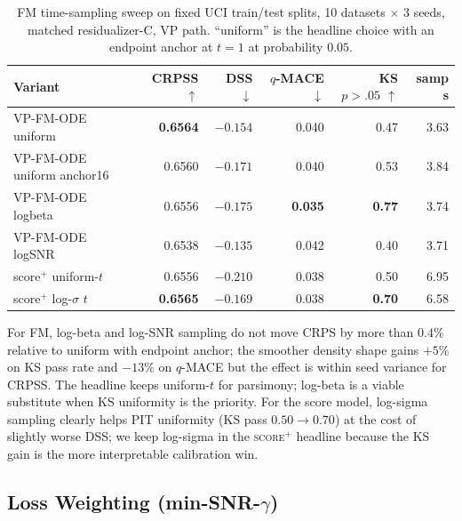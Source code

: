 \documentclass{tpm2026}
\begin{document}
\begin{table}[!h]
  \centering
  \caption{FM time-sampling sweep on fixed UCI train/test splits, 10 datasets $\times$ 3 seeds, matched residualizer-C, VP path. ``uniform'' is the headline choice with an endpoint anchor at $t=1$ at probability $0.05$.}\label{tab:t-sampling}
  \footnotesize
  \begin{tabular}{lrrrrr}
    \toprule
    Variant & CRPSS $\uparrow$ & DSS $\downarrow$ & $q$-MACE $\downarrow$ & KS $p{>}.05$ $\uparrow$ & samp s \\
    \midrule
    VP-FM-ODE uniform           & \textbf{0.6564} & $-0.154$ & 0.040 & 0.47 & 3.63 \\
    VP-FM-ODE uniform anchor16  & 0.6560 & \textbf{$-0.171$} & 0.040 & 0.53 & 3.84 \\
    VP-FM-ODE logbeta           & 0.6556 & $-0.175$ & \textbf{0.035} & \textbf{0.77} & 3.74 \\
    VP-FM-ODE logSNR            & 0.6538 & $-0.135$ & 0.042 & 0.40 & 3.71 \\
    \midrule
    score$^+$ uniform-$t$       & 0.6556 & \textbf{$-0.210$} & 0.038 & 0.50 & 6.95 \\
    score$^+$ log-$\sigma$ $t$  & \textbf{0.6565} & $-0.169$ & 0.038 & \textbf{0.70} & 6.58 \\
    \bottomrule
  \end{tabular}
\end{table}

For FM, log-beta and log-SNR sampling do not move CRPS by more than $0.4\%$ relative to uniform with endpoint anchor; the smoother density shape gains $+5\%$ on KS pass rate and $-13\%$ on $q$-MACE but the effect is within seed variance for CRPSS. The headline keeps uniform-$t$ for parsimony; log-beta is a viable substitute when KS uniformity is the priority. For the score model, log-sigma sampling clearly helps PIT uniformity (KS pass $0.50 \to 0.70$) at the cost of slightly worse DSS; we keep log-sigma in the \textsc{score$^+$} headline because the KS gain is the more interpretable calibration win.

\subsection{Loss Weighting (min-SNR-$\gamma$)}\label{app:loss-weighting}
\end{document}
